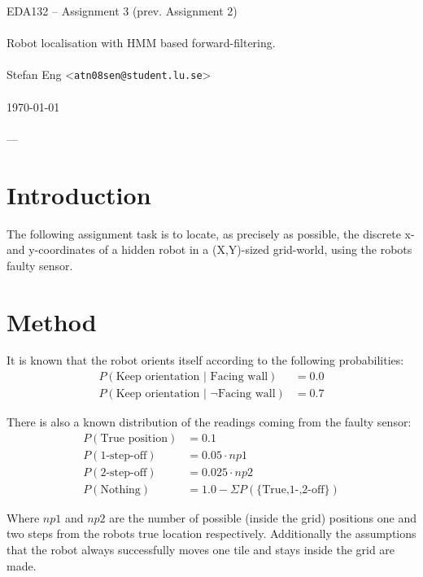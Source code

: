 \documentclass{article}
\begin{document}
  \begin{center}
    EDA132 -- Assignment 3 (prev. Assignment 2)\\
    \ \\
    {\Large Robot localisation with HMM based forward-filtering.} \\
    \ \\
    Stefan Eng <\texttt{atn08sen@student.lu.se}> \\
    \ \\
    \today \\
    \ \\
    ---
  \end{center}
  \vspace{-0.8cm}
  \section*{Introduction}

    The following assignment task is to locate, as precisely as possible, the
    discrete x- and y-coordinates of a hidden robot in a (X,Y)-sized
    grid-world, using the robots faulty sensor.

  \section*{Method}

    It is known that the robot orients itself according to the following
    probabilities:
    \begin{align*}
      P(\textrm{Keep orientation | Facing wall}) &= 0.0 \\
      P(\textrm{Keep orientation | $\neg$Facing wall}) &= 0.7
    \end{align*}

    There is also a known distribution of the readings coming from the faulty
    sensor:
    \begin{align*}
      P(\textrm{True position}) &= 0.1 \\
      P(\textrm{1-step-off}) &= 0.05 \cdot np1\\
      P(\textrm{2-step-off}) &= 0.025 \cdot np2\\
      P(\textrm{Nothing}) &= 1.0-\Sigma P(\textrm{\{True,1-,2-off\}})
    \end{align*}

    Where $np1$ and $np2$ are the number of possible (inside the grid)
    positions one and two steps from the robots true location respectively.
    Additionally the assumptions that the robot always successfully moves one
    tile and stays inside the grid are made. \\
\end{document}
